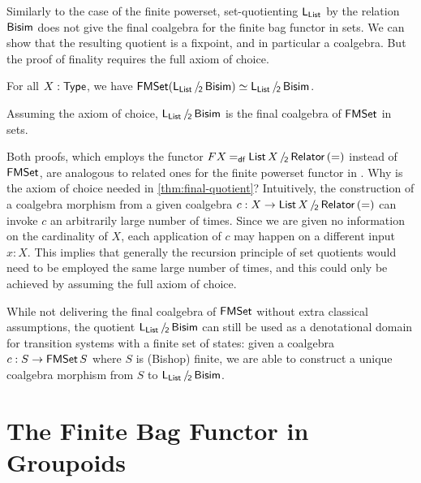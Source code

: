 \documentclass[runningheads]{llncs}
\begin{document}
Similarly to the case of the finite powerset, set-quotienting $\mathsf{L}_{\operatorname{\mathsf{List}}}$ by the relation $\mathsf{Bisim}$ does not give the final coalgebra for the finite bag functor in sets. We can show that the resulting quotient is a fixpoint, and in particular a coalgebra. But the proof of finality requires the full axiom of choice. 
\begin{theorem}\label{thm:fixpoint-quotient}
  For all $X : \operatorname{\mathsf{Type}}$, we have $\FMSet(\SetQuot[\Lim{\List}][\Bisim]) \simeq \SetQuot[\Lim{\List}][\Bisim]$.
\end{theorem}
\begin{theorem}\label{thm:final-quotient}
  Assuming the axiom of choice, $\SetQuot[\Lim{\List}][\Bisim]$ is the final coalgebra of $\operatorname{\mathsf{FMSet}}$ in sets.
\end{theorem}
Both proofs, which employs the functor $F X \DefEq \SetQuot[\List X][\Relator\,(=)]$ instead of $\operatorname{\mathsf{FMSet}}$, are analogous to related ones for the finite powerset functor in \cite{Veltri2021}.
Why is the axiom of choice needed in \cref{thm:final-quotient}? Intuitively, the construction of a coalgebra morphism from a given coalgebra $c : X \to \SetQuot[\List X][\Relator\,(=)]$ can invoke $c$ an arbitrarily large number of times. Since we are given no information on the
cardinality of $X$, each application of $c$ may happen on a different
input $x: X$. This implies that generally the recursion principle of
set quotients would need to be employed the same large number of times,
and this could only be achieved by assuming the full axiom of choice.


While not delivering the final coalgebra of $\operatorname{\mathsf{FMSet}}$ without extra classical assumptions, the quotient $\SetQuot[\Lim{\List}][\Bisim]$ can still be used as a denotational domain for transition systems with a finite set of states: given a coalgebra $c : S \to \operatorname{\mathsf{FMSet}} S$ where $S$ is (Bishop) finite, we are able to construct a unique coalgebra morphism from $S$ to $\SetQuot[\Lim{\List}][\Bisim]$.

\section{The Finite Bag Functor in Groupoids}\label{sec:finite-bags-groupoids}
\end{document}
